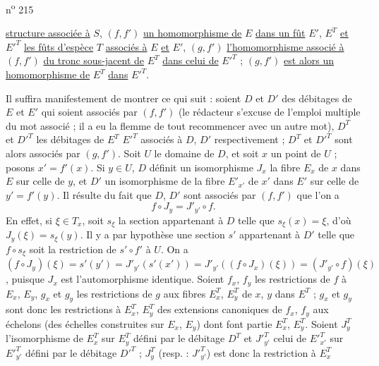 n\textsuperscript{o} 215

\uline{structure associée à} $S$, $(f,f')$ \uline{un homomorphisme de} $E$ \uline{dans un fût} $E'$, $E^T$ \uline{et} ${E'}^T$ \uline{les fûts d'espèce} $T$ \uline{associés à} $E$ \uline{et} $E'$, $(g,f')$ \uline{l'homomorphisme associé à} $(f,f')$ \uline{du tronc sous-jacent de} $E^T$ \uline{dans celui de} ${E'}^T$ ; $(g,f')$ \uline{est alors un homomorphisme de} $E^T$ \uline{dans} ${E'}^T$.

Il suffira manifestement de montrer ce qui suit : soient $D$ et $D'$ des débitages de $E$ et $E'$ qui soient associés par $(f,f')$ (le rédacteur s'excuse de l'emploi multiple du mot  associé ; il a eu la flemme de tout recommencer avec un autre mot), $D^T$ et ${D'}^T$ les débitages de $E^T$  ${E'}^T$ associés à $D$, $D'$ respectivement ; $D^T$ et ${D'}^T$ sont alors associés par $(g,f')$. Soit $U$ le domaine de $D$, et soit $x$ un point de $U$ ; posons $x'=f'(x)$. Si $y\in U$, $D$ définit un isomorphisme $J_x$  la fibre $E_x$ de $x$ dans $E$ sur celle de $y$, et $D'$ un isomorphisme de la fibre $E'_{x'}$ de $x'$ dans $E'$ sur celle de $y'=f'(y)$. Il résulte du fait que $D$, $D'$ sont associés par $(f,f')$ que l'on a
\[
f\circ J_y=J'_{y'}\circ f.
\]
En effet, si $\xi\in T_x$, soit $s_\xi$ la section appartenant à $D$ telle que $s_\xi(x)=\xi$, d'où $J_y(\xi)=s_\xi(y)$. Il y a par hypothèse une section $s'$ appartenant à $D'$ telle que $f\circ s_\xi$ soit la restriction de $s'\circ f'$ à $U$. On a $(f\circ J_y)(\xi)=s'(y')=J'_{y'}(s'(x'))=J'_{y'}((f\circ J_x)(\xi))=(J'_{y'}\circ f)(\xi)$, puisque $J_x$ est l'automorphisme identique. Soient $f_x$, $f_y$ les restrictions de $f$ à $E_x$, $E_y$, $g_x$ et $g_y$ les restrictions de $g$ aux fibres $E_x^T$, $E_y^T$ de $x$, $y$ dans $E^T$ ; $g_x$ et $g_y$ sont donc les restrictions à $E_x^T$, $E_y^T$ des extensions canoniques de $f_x$, $f_y$ aux échelons (des échelles construites sur $E_x$, $E_y$) dont font partie $E_x^T$, $E_y^T$. Soient $J_y^T$ l'isomorphisme de $E_x^T$ sur $E_y^T$ défini par le débitage $D^T$ et ${J'}^{T}_{y'}$ celui de ${E'}^{T}_{x'}$ sur ${E'}^{T}_{y'}$ défini par le débitage ${D'}^T$ ; $J_y^T$ (resp. : ${J'}^{T}_{y'}$) est donc la restriction à $E_x^T$
